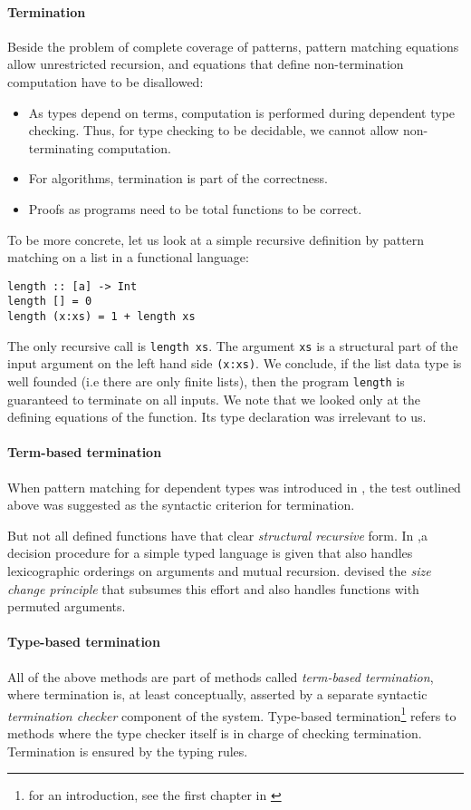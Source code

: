 \paragraph*{Termination}
Beside the problem of complete coverage of patterns, pattern matching equations allow unrestricted recursion, and equations that define non-termination computation have to be disallowed: 
\begin{itemize}
\item
As types depend on terms, computation is performed during dependent type checking.
Thus, for type checking to be decidable, we cannot allow non-terminating computation. 
\item
For algorithms, termination is part of the correctness.
\item
Proofs as programs need to be total functions to be correct.
\end{itemize}
To be more concrete, let us look at a simple recursive definition by pattern matching on a list in a functional language: 
\begin{verbatim}
length :: [a] -> Int
length [] = 0
length (x:xs) = 1 + length xs 
\end{verbatim}
The only recursive call is \texttt{length xs}.
The argument \texttt{xs} is a structural part of the input argument on the left hand side \texttt{(x:xs)}.
We conclude, if the list data type is well founded (i.e there are only finite lists), then the program \texttt{length} is guaranteed to terminate on all inputs.
We note that we looked only at the defining equations of the function. Its type declaration was irrelevant to us.
\paragraph*{Term-based termination}
When pattern matching for dependent types was introduced in  \cite{coquand92pattern},
the test outlined above was suggested as the syntactic criterion for termination. 

But not all defined functions have that clear \emph{structural recursive} form.
In \cite{abelAltenkirch:predStRec},a decision procedure for a simple typed language is given that also handles lexicographic orderings on arguments and mutual recursion.
\cite{lee01sizechange} devised the \emph{size change principle} that subsumes this effort and also handles functions with permuted arguments. 
\paragraph*{Type-based termination}
All of the above methods are part of methods called \emph{term-based termination}, where termination is, at least conceptually,  asserted by a separate syntactic \emph{termination checker} component of the system. 
Type-based termination\footnote{for an introduction, see the first chapter in \cite{abel:PhD}} refers to methods where the type checker itself is in charge of checking termination. Termination is ensured by the typing rules. 

